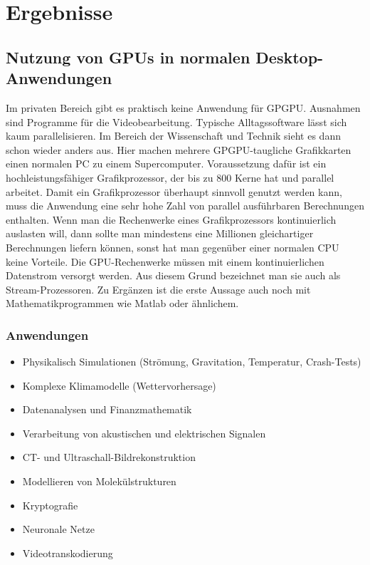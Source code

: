 
\section{Ergebnisse}
\label{sec:Ergebnisse}


\subsection{Nutzung von GPUs in normalen Desktop-Anwendungen}
\label{sec:Nutzung von GPUs in normalen Desktop-Anwendungen}
Im privaten Bereich gibt es praktisch keine Anwendung für GPGPU. Ausnahmen sind Programme für die Videobearbeitung. Typische Alltagssoftware lässt sich kaum parallelisieren. Im Bereich der Wissenschaft und Technik sieht es dann schon wieder anders aus. Hier machen mehrere GPGPU-taugliche Grafikkarten einen normalen PC zu einem Supercomputer.
Voraussetzung dafür ist ein hochleistungsfähiger Grafikprozessor, der bis zu 800 Kerne hat und parallel arbeitet. Damit ein Grafikprozessor überhaupt sinnvoll genutzt werden kann, muss die Anwendung eine sehr hohe Zahl von parallel ausführbaren Berechnungen enthalten. Wenn man die Rechenwerke eines Grafikprozessors kontinuierlich auslasten will, dann sollte man mindestens eine Millionen gleichartiger Berechnungen liefern können, sonst hat man gegenüber einer normalen CPU keine Vorteile. Die GPU-Rechenwerke müssen mit einem kontinuierlichen Datenstrom versorgt werden. Aus diesem Grund bezeichnet man sie auch als Stream-Prozessoren. \cite{elektronik_gpgpu}
Zu Ergänzen ist die erste Aussage auch noch mit Mathematikprogrammen wie Matlab oder ähnlichem.
\cite{matlab}

\subsubsection{Anwendungen}
\label{sec:Anwendungen}
\begin{itemize}
\item Physikalisch Simulationen (Strömung, Gravitation, Temperatur, Crash-Tests)
\item Komplexe Klimamodelle (Wettervorhersage)
\item Datenanalysen und Finanzmathematik
\item Verarbeitung von akustischen und elektrischen Signalen
\item CT- und Ultraschall-Bildrekonstruktion
\item Modellieren von Molekülstrukturen
\item Kryptografie
\item Neuronale Netze
\item Videotranskodierung
\end{itemize}

